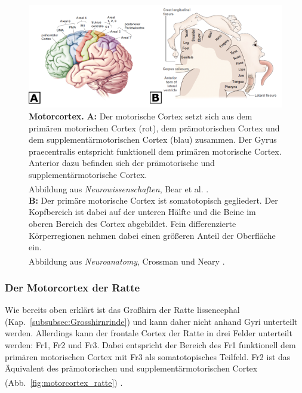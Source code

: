 \begin{figure}[H]
    \centering
    \includegraphics[width=\textwidth]{pictures/Bilder_Laura/Motorcortex_2.png}
    \caption[Motorcortex]{\textbf{Motorcortex.} \textbf{A:} Der motorische Cortex setzt sich aus dem primären motorischen Cortex (rot), dem prämotorischen Cortex und dem supplementärmotorischen Cortex (blau) zusammen. Der Gyrus praecentralis entspricht funktionell dem primären motorische Cortex. Anterior dazu befinden sich der prämotorische und supplementärmotorische Cortex. \\
    Abbildung aus \textit{Neurowissenschaften}, Bear et al. \textsuperscript{\cite[14]{neurowissenschaften_baer}}.\\ \textbf{B:} Der primäre motorische Cortex ist somatotopisch gegliedert. Der Kopfbereich ist dabei auf der unteren Hälfte und die Beine im oberen Bereich des Cortex abgebildet. Fein differenzierte Körperregionen nehmen dabei einen größeren Anteil der Oberfläche ein. \\
    Abbildung aus \textit{Neuroanatomy}, Crossman und Neary \textsuperscript{\cite[8]{crossman2014neuroanatomy}}.}
    \label{fig:motorkortex}
\end{figure}

\subsubsection*{Der Motorcortex der Ratte}
Wie bereits oben erklärt ist das Großhirn der Ratte lissencephal (Kap.~\ref{subsubsec:Grosshirnrinde}) und kann daher nicht anhand Gyri unterteilt werden.  
Allerdings kann der frontale Cortex der Ratte in drei Felder unterteilt werden: Fr1, Fr2 und Fr3. Dabei entspricht der Bereich des Fr1 funktionell dem primären motorischen Cortex mit Fr3 als somatotopisches Teilfeld. Fr2 ist das Äquivalent des prämotorischen und supplementärmotorischen Cortex (Abb.~\ref{fig:motorcortex_ratte}) \textsuperscript{\cite[22]{paxinos2014rat}}.  

